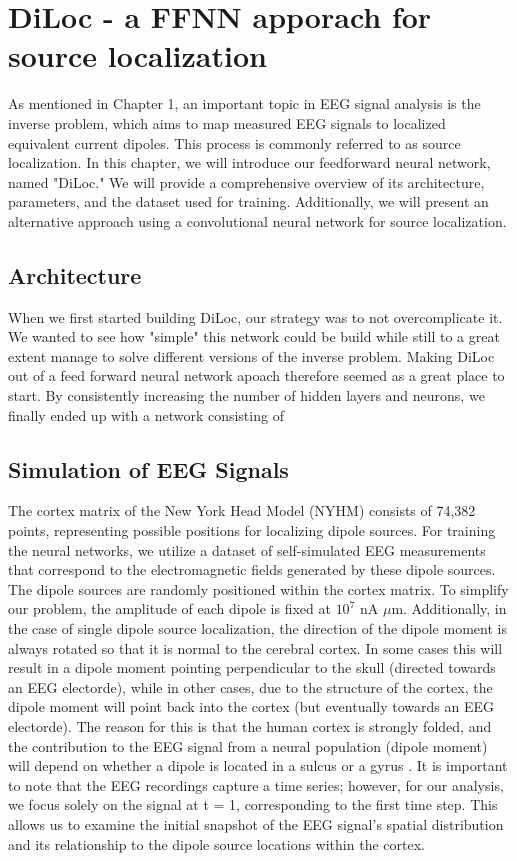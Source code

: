 \documentclass[a4paper, UKenglish, 11pt]{uiomaster}
\begin{document}
\chapter{DiLoc - a FFNN apporach for source localization}
As mentioned in Chapter 1, an important topic in EEG signal analysis is the inverse problem, which aims to map measured EEG signals to localized equivalent current dipoles. This process is commonly referred to as source localization. In this chapter, we will introduce our feedforward neural network, named "DiLoc." We will provide a comprehensive overview of its architecture, parameters, and the dataset used for training. Additionally, we will present an alternative approach using a convolutional neural network for source localization.

\section{Architecture}
When we first started building DiLoc, our strategy was to not overcomplicate it. We wanted to see how "simple" this network could be build while still to a great extent manage to solve different versions of the inverse problem. Making DiLoc out of a feed forward neural network apoach therefore seemed as a great place to start. By consistently increasing the number of hidden layers and neurons, we finally ended up with a network consisting of 

\section{Simulation of EEG Signals}
The cortex matrix of the New York Head Model (NYHM) consists of 74,382 points, representing possible positions for localizing dipole sources. For training the neural networks, we utilize a dataset of self-simulated EEG measurements that correspond to the electromagnetic fields generated by these dipole sources. The dipole sources are randomly positioned within the cortex matrix. To simplify our problem, the amplitude of each dipole is fixed at $10^7$ nA $\mu$m. Additionally,  in the case of single dipole source localization, the direction of the dipole moment is always rotated so that it is normal to the cerebral cortex. In some cases this will result in a dipole moment pointing perpendicular to the skull (directed towards an EEG electorde), while in other cases, due to the structure of the cortex, the dipole moment will point back into the cortex (but eventually towards an EEG electorde). The reason for this is that the human cortex is strongly folded, and the contribution to the EEG signal from a neural population (dipole moment) will depend on whether a dipole is located in a sulcus or a gyrus \cite{naess2021biophysically}. It is important to note that the EEG recordings capture a time series; however, for our analysis, we focus solely on the signal at t = 1, corresponding to the first time step. This allows us to examine the initial snapshot of the EEG signal's spatial distribution and its relationship to the dipole source locations within the cortex.
\end{document}
